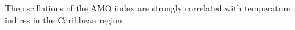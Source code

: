 \documentclass[draft]{agujournal2019}
\begin{document}



The oscillations of the AMO index are strongly correlated with temperature indices in the Caribbean region \cite{stephenson_changes_2014}.
\end{document}
